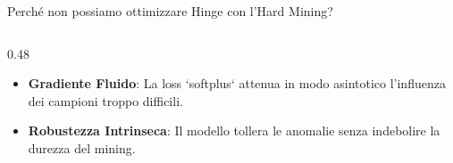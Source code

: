 \documentclass[aspectratio=169, 10pt]{beamer}
\begin{document}
\begin{frame}{Perché non possiamo ottimizzare Hinge con l'Hard Mining?}
\begin{columns}[T, onlytextwidth]
\begin{column}{0.48\textwidth}
    \smallskip
    {\scriptsize
    \begin{itemize}
        \setlength{\itemsep}{2pt}
        \setlength{\parskip}{0pt}
        \item \textbf{Gradiente Fluido}: La loss `softplus` attenua in modo asintotico l'influenza dei campioni troppo difficili.
        \item \textbf{Robustezza Intrinseca}: Il modello tollera le anomalie senza indebolire la durezza del mining.
    \end{itemize}
    }
\end{column}

\end{columns}
\end{frame}

\end{document}
